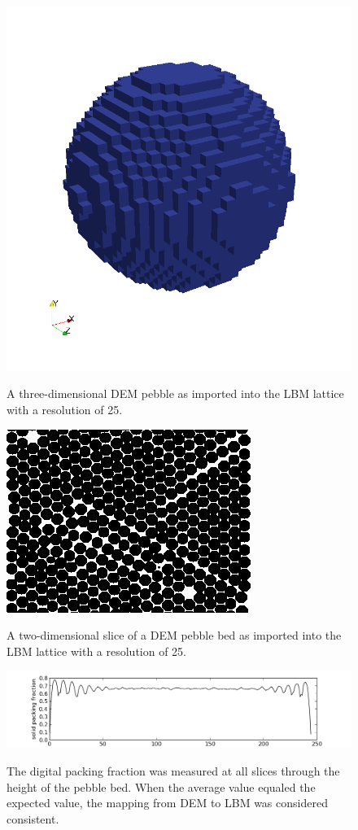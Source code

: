 \begin{figure}[ht]
	\centering
	\caption{A three-dimensional DEM pebble as imported into the LBM lattice with a resolution of 25.}
	\includegraphics[width=\doubleimagewidth]{chapters/figures/lbm/lbm-pebble-res25.png}\label{fig:dem-2-lbm-example2}
\end{figure}
\begin{figure}[ht]
	\centering
	\caption{A two-dimensional slice of a DEM pebble bed as imported into the LBM lattice with a resolution of 25.}
	\includegraphics[width=\doubleimagewidth]{chapters/figures/lbm/crossSection0024.jpg}\label{fig:dem-2-lbm-example3}
\end{figure}
\begin{figure}[ht]
	\centering
	\caption{The digital packing fraction was measured at all slices through the height of the pebble bed. When the average value equaled the expected value, the mapping from DEM to LBM was considered consistent.}
	\includegraphics[width=\textwidth]{chapters/figures/lbm/palabos_packing_fraction}\label{fig:dem-2-lbm-packing-fraction}
\end{figure}
